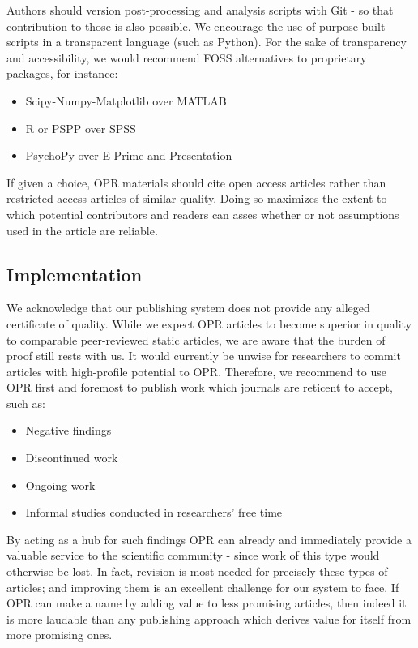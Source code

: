 Authors should version post-processing and analysis scripts with Git - so that contribution to those is also possible.
We encourage the use of purpose-built scripts in a transparent language (such as Python).
For the sake of transparency and accessibility, we would recommend FOSS alternatives to proprietary packages, for instance:
\begin{itemize}
	\item Scipy-Numpy-Matplotlib\cite{numpy} over MATLAB
	\item R\cite{r} or PSPP\cite{pspp} over SPSS
	\item PsychoPy\cite{psychopy,Peirce2007} over E-Prime and Presentation
\end{itemize}
If given a choice, OPR materials should cite open access articles rather than restricted access articles of similar quality.
Doing so maximizes the extent to which potential contributors and readers can asses whether or not assumptions used in the article are reliable.
\subsection{Implementation}
We acknowledge that our publishing system does not provide any alleged certificate of quality.
While we expect OPR articles to become superior in quality to comparable peer-reviewed static articles, we are aware that the burden of proof still rests with us.
It would currently be unwise for researchers to commit articles with high-profile potential to OPR.
Therefore, we recommend to use OPR first and foremost to publish work which journals are reticent to accept, such as:
\begin{itemize}
	\item Negative findings
	\item Discontinued work
	\item Ongoing work
	\item Informal studies conducted in researchers' free time
\end{itemize}
By acting as a hub for such findings OPR can already and immediately provide a valuable service to the scientific community - since work of this type would otherwise be lost.
In fact, revision is most needed for precisely these types of articles;
and improving them is an excellent challenge for our system to face.
If OPR can make a name by adding value to less promising articles, then indeed it is more laudable than any publishing approach which derives value for itself from more promising ones.

